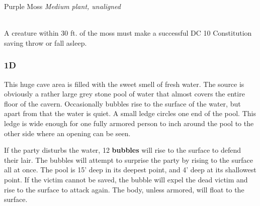 \documentclass[palace_of_the_silver_princess]{subfiles}
\begin{document}
\begin{monsterbox}{Purple Moss}
    \textit{Medium plant, unaligned}\\
    \hline
    \basics[%
        armorclass = 5,
        hitpoints  = 18 (4d8),
        speed      = 5 ft
    ]
    \hline
    \stats[
        STR = \stat{3},
        DEX = \stat{1},
        CON = \stat{10},
        INT = \stat{1},
        WIS = \stat{3},
        CHA = \stat{1}
    ]
    \hline
    \details[
        languages = {---},
        challenge = {1/4},
        damagevulnerabilities = {fire},
    ]
    \hline
    \\[1mm]
    \begin{monsteraction}
        A creature within 30 ft. of the moss must make a successful DC
        10 Constitution saving throw or fall asleep.
    \end{monsteraction}
\end{monsterbox}

\subsubsection{1D}
\begin{quotebox}
    This huge cave area is filled with the sweet smell of fresh water.
    The source is obviously a rather large grey stone pool of water that
    almost covers the entire floor of the cavern. Occasionally bubbles
    rise to the surface of the water, but apart from that the water is
    quiet. A small ledge circles one end of the pool. This ledge is wide
    enough for one fully armored person to inch around the pool to the
    other side where an opening can be seen.
\end{quotebox}

If the party disturbs the water, 12 \textbf{bubbles} will rise to the
surface to defend their lair. The bubbles will attempt to surprise the
party by rising to the surface all at once.  The pool is 15’ deep in its
deepest point, and 4’ deep at its shallowest point.  If the victim
cannot be saved, the bubble will expel the dead victim and rise to the
surface to attack again. The body, unless armored, will float to the
surface.
\end{document}
